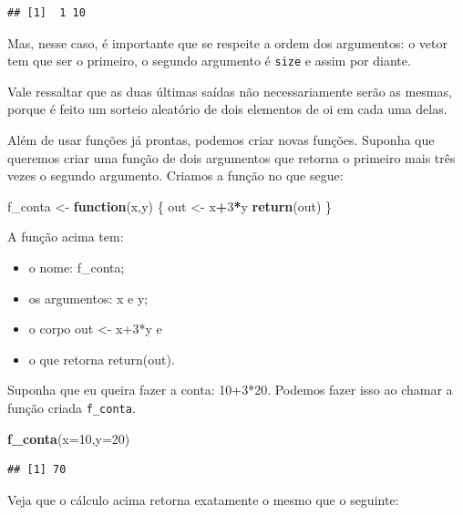 \documentclass[
]{book}
\newenvironment{Shaded}{\begin{snugshade}}{\end{snugshade}}
\newcommand{\ControlFlowTok}[1]{\textcolor[rgb]{0.13,0.29,0.53}{\textbf{#1}}}
\newcommand{\DataTypeTok}[1]{\textcolor[rgb]{0.13,0.29,0.53}{#1}}
\newcommand{\DecValTok}[1]{\textcolor[rgb]{0.00,0.00,0.81}{#1}}
\newcommand{\KeywordTok}[1]{\textcolor[rgb]{0.13,0.29,0.53}{\textbf{#1}}}
\newcommand{\NormalTok}[1]{#1}
\newcommand{\OperatorTok}[1]{\textcolor[rgb]{0.81,0.36,0.00}{\textbf{#1}}}
\newcommand{\StringTok}[1]{\textcolor[rgb]{0.31,0.60,0.02}{#1}}
\begin{document}
\begin{verbatim}
## [1]  1 10
\end{verbatim}

Mas, nesse caso, é importante que se respeite a ordem dos argumentos: o vetor tem que ser o primeiro, o segundo argumento é \texttt{size} e assim por diante.

Vale ressaltar que as duas últimas saídas não necessariamente serão as mesmas, porque é feito um sorteio aleatório de dois elementos de oi em cada uma delas.

Além de usar funções já prontas, podemos criar novas funções. Suponha que queremos criar uma função de dois argumentos que retorna o primeiro mais três vezes o segundo argumento. Criamos a função no que segue:

\begin{Shaded}
\begin{Highlighting}[]
\NormalTok{f_conta <-}\StringTok{ }\ControlFlowTok{function}\NormalTok{(x,y) \{}
\NormalTok{  out <-}\StringTok{ }\NormalTok{x}\OperatorTok{+}\DecValTok{3}\OperatorTok{*}\NormalTok{y}
  \KeywordTok{return}\NormalTok{(out)}
\NormalTok{\}}
\end{Highlighting}
\end{Shaded}

A função acima tem:

\begin{itemize}
\item
  o nome: f\_conta;
\item
  os argumentos: x e y;
\item
  o corpo out \textless- x+3*y e
\item
  o que retorna return(out).
\end{itemize}

Suponha que eu queira fazer a conta: 10+3*20. Podemos fazer isso ao chamar a função criada \texttt{f\_conta}.

\begin{Shaded}
\begin{Highlighting}[]
\KeywordTok{f_conta}\NormalTok{(}\DataTypeTok{x=}\DecValTok{10}\NormalTok{,}\DataTypeTok{y=}\DecValTok{20}\NormalTok{)}
\end{Highlighting}
\end{Shaded}

\begin{verbatim}
## [1] 70
\end{verbatim}

Veja que o cálculo acima retorna exatamente o mesmo que o seguinte:
\end{document}
